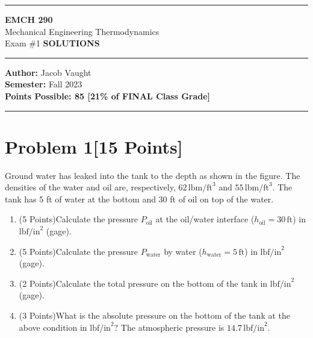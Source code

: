 \documentclass{article}
\begin{document}
\hrule
\vspace{0.2cm}

\begin{center}
    \LARGE \textbf{EMCH 290} \\
    \Large Mechanical Engineering Thermodynamics \\
    \large Exam \#1 \textbf{SOLUTIONS}
\end{center}

\hrule
\vspace{0.2cm}

\begin{center}
    \textbf{Author:} Jacob Vaught \\
    \vspace{0.2cm}
    \textbf{Semester:} Fall 2023 \\
    \vspace{0.2cm}
    \textbf{Points Possible: 85 [21\% of FINAL Class Grade]}
\end{center}

\hrule
\vspace{0.5cm}
\newpage
\section*{Problem 1[15 Points]}
Ground water has leaked into the tank to the depth as shown in the figure. The densities of the water and oil are, respectively, \(62 \, \text{lbm/ft}^3\) and \(55 \, \text{lbm/ft}^3\). The tank has 5 ft of water at the bottom and 30 ft of oil on top of the water.

\begin{enumerate}
    \item (5 Points)Calculate the pressure \(P_{\text{oil}}\) at the oil/water interface (\(h_{\text{oil}} = 30 \, \text{ft}\)) in \( \text{lbf/in}^2 \) (gage).
    \item (5 Points)Calculate the pressure \(P_{\text{water}}\) by water (\(h_{\text{water}} = 5 \, \text{ft}\)) in \( \text{lbf/in}^2 \) (gage).
    \item (2 Points)Calculate the total pressure on the bottom of the tank in \( \text{lbf/in}^2 \) (gage).
    \item (3 Points)What is the absolute pressure on the bottom of the tank at the above condition in \( \text{lbf/in}^2 \)? The atmospheric pressure is \(14.7 \, \text{lbf/in}^2\).
\end{enumerate}
\end{document}
